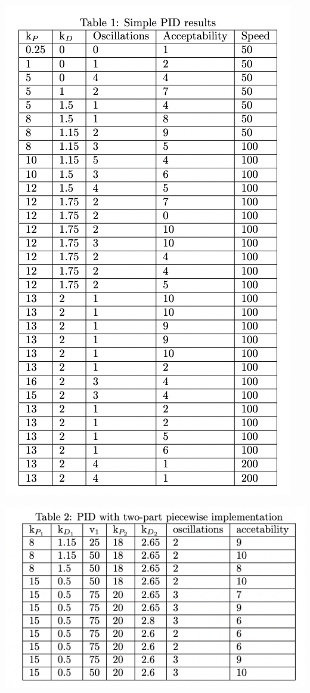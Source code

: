 \documentclass[12pt]{article}
\begin{document}
\begin{multicols}{2}
\begin{center}
    \includegraphics*[scale=0.3]{Table1.png}
\end{center}
\begin{center}
    \includegraphics*[scale=0.5]{Table2.png}

\end{center}
\end{multicols}
\end{document}
